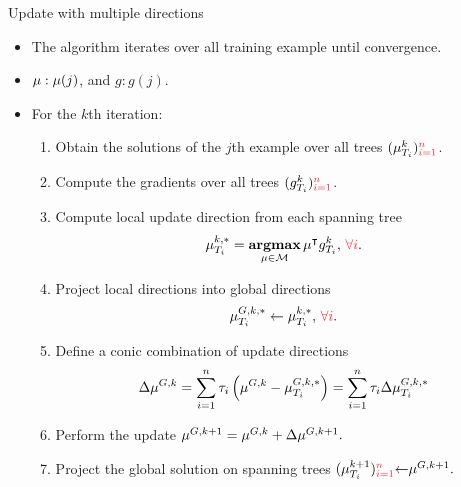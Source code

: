 \documentclass[first=dgreen,second=purple,logo=yellowexc]{aaltoslides}
\begin{document}
\begin{frame}{Update with multiple directions}
	\begin{itemize}\footnotesize
		\item The algorithm iterates over all training example until convergence.
		\item $\mathbf {\mu}:\mathbf {\mu}(j)$, and $g:g(j)$.
		\item For the $k$th iteration:
		\begin{enumerate}\footnotesize
			\item Obtain the solutions of the $j$th example over all trees $(\vmu_{T_i}^k){\color{aaltored}_{i=1}^n}$.
			\item Compute the gradients over all trees $(g_{T_i}^k){\color{aaltored}_{i=1}^n}$.
			\item Compute local update direction from each spanning tree
			\begin{align*}
				{\vmu}_{T_i}^{k,*} = \underset{\vmu\in\Mcal}{\argmax}\,\vmu\tp g_{T_i}^k,\,{\color{aaltored}\forall i}.
			\end{align*}
			\item Project local directions into global directions
			\begin{align*}
				{\vmu}_{T_i}^{G,k,*} \leftarrow {\vmu}_{T_i}^{k,*},\,{\color{aaltored}\forall i}.
			\end{align*}
			\item Define a conic combination of update directions 
			\begin{align*}
				\Delta{\mathbf {\mu}}^{G,k} = \sum_{i=1}^{n}\tau_i \left({\mathbf {\mu}}^{G,k} -{\mathbf {\mu}}_{T_i}^{G,k,*}\right) = \sum_{i=1}^{n}\tau_i \Delta{\mathbf {\mu}}_{T_i}^{G,k,*}
			\end{align*}
			\item Perform the update $\mathbf {\mu}^{G,k+1} = \mathbf {\mu}^{G,k} + \Delta{\mathbf {\mu}}^{G,k+1}.$
			\item Project the global solution on spanning trees $(\vmu_{T_i}^{k+1}){\color{aaltored}_{i=1}^{n}}{\leftarrow}\vmu^{G,k+1}.$
		\end{enumerate}
	\end{itemize}
\end{frame}
\end{document}
